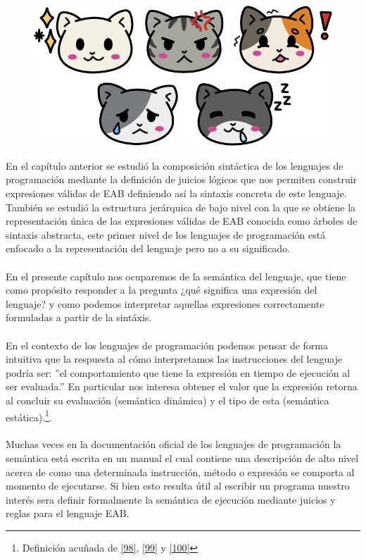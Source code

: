 
\begin{figure}[htbp]
    \centerline{\includegraphics[scale=.4]{assets/04_gatito_semantica.jpg}}       
\end{figure}


\bigskip
\bigskip
\bigskip
\bigskip


    En el capítulo anterior se estudió la composición sintáctica de los lenguajes de programación mediante la definición de juicios lógicos que nos permiten construir expresiones válidas de \textsf{EAB} definiendo así la sintaxis 
    concreta de este lenguaje. También se estudió la estructura jerárquica de bajo nivel con la que se obtiene la representación única de las expresiones válidas de \textsf{EAB} conocida como árboles de sintaxis abstracta, este primer nivel de los lenguajes de programación está enfocado a la representación del lenguaje pero no a su significado.\\\\
    En el presente capítulo nos ocuparemos de la semántica del lenguaje, que tiene como propósito responder a la pregunta ¿qué significa una expresión del lenguaje? y como podemos interpretar aquellas expresiones correctamente formuladas a partir de la sintáxis.\\\\
    En el contexto de los lenguajes de programación podemos pensar de forma intuitiva que la respuesta al cómo interpretamos las instrucciones del lenguaje podría ser: ''el comportamiento que tiene la expresión en tiempo de ejecución al ser evaluada.'' 
    En particular  nos interesa obtener el valor que la expresión retorna al concluir su evaluación (semántica dinámica) y el tipo de esta (semántica estática).\footnote{Definición acuñada de \hyperlink{98}{[98]}, \hyperlink{99}{[99]} y \hyperlink{100}{[100]}}.\\\\
    Muchas veces en la documentación oficial de los lenguajes de programación la semántica está escrita en un manual el cual contiene una descripción de alto nivel
    acerca de como una determinada instrucción, método o expresión se comporta al momento de ejecutarse. Si bien esto resulta útil al escribir un programa nuestro interés sera definir formalmente la semántica de ejecución mediante juicios y reglas para el lenguaje \textsf{EAB}. \\


